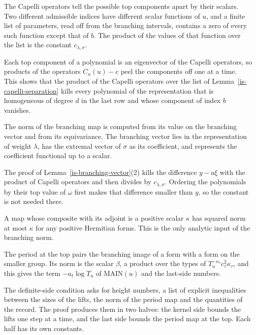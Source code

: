 The Capelli operators tell the possible top components apart by their scalars. Two different
admissible indices have different scalar functions of $u$, and a finite list of parameters, read off
from the branching intervals, contains a zero of every such function except that of $b$. The product
of the values of that function over the list is the constant $c_{\lambda,\sigma}$.

Each top component of a polynomial is an eigenvector of the Capelli operators, so products of the
operators $C_n(u)-c$ peel the components off one at a time. This shows that the product of the
Capelli operators over the list of Lemma~\ref{is-capelli-separation} kills every polynomial of
the representation that is homogeneous of degree $d$ in the last row and whose component of index
$b$ vanishes.

The norm of the branching map is computed from its value on the branching vector and from its
equivariance. The branching vector lies in the representation of weight $\lambda$, has the extremal
vector of $\sigma$ as its coefficient, and represents the coefficient functional up to a scalar.

The proof of Lemma~\ref{is-branching-vector}(2) kills the difference $y-a\xi$ with the product
of Capelli operators and then divides by $c_{\lambda,\sigma}$. Ordering the polynomials by their top
value of $\omega$ first makes that difference smaller than $y$, so the constant is not needed there.

A map whose composite with its adjoint is a positive scalar $\kappa$ has squared norm at most $\kappa$
for any positive Hermitian forms. This is the only analytic input of the branching norm.

The period at the top pairs the branching image of a form with a form on the smaller group. Its
norm is the scalar $\beta$, a product over the types of $T_u^{-n_\tau}c_\tau^2\kappa_\tau$, and this
gives the term $-a_t\log T_u$ of $\mathrm{MAIN}(u)$ and the last-side numbers.

The definite-side condition asks for height numbers, a list of explicit inequalities between the
sizes of the lifts, the norm of the period map and the quantities of the record. The proof produces
them in two halves: the kernel side bounds the lifts one step at a time, and the last side bounds
the period map at the top. Each half has its own constants.

